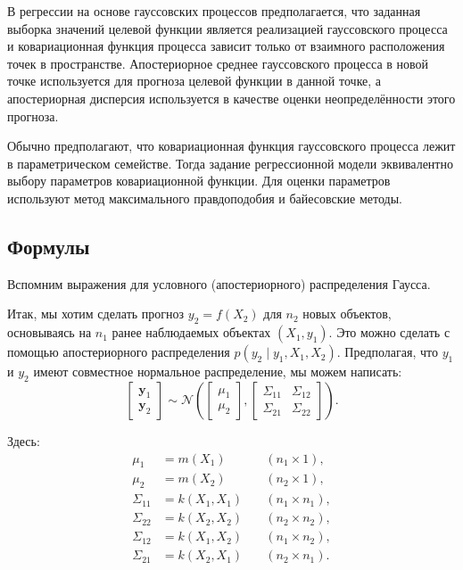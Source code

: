 \documentclass[11pt,a4paper]{article}
\begin{document}
    В регрессии на основе гауссовских процессов предполагается, что заданная
выборка значений целевой функции является реализацией гауссовского
процесса и ковариационная функция процесса зависит только от взаимного
расположения точек в пространстве. Апостериорное среднее гауссовского
процесса в новой точке используется для прогноза целевой функции в
данной точке, а апостериорная дисперсия используется в качестве оценки
неопределённости этого прогноза.

Обычно предполагают, что ковариационная функция гауссовского процесса
лежит в параметрическом семействе. Тогда задание регрессионной модели
эквивалентно выбору параметров ковариационной функции. Для оценки
параметров используют метод максимального правдоподобия и байесовские
методы.

    \hypertarget{ux444ux43eux440ux43cux443ux43bux44b}{%
\subsection{Формулы}\label{ux444ux43eux440ux43cux443ux43bux44b}}

Вспомним выражения для условного (апостериорного) распределения Гаусса.

Итак, мы хотим сделать прогноз \(y_2 = f(X_2)\) для \(n_2\) новых
объектов, основываясь на \(n_1\) ранее наблюдаемых объектах
\((X_1,y_1)\). Это можно сделать с помощью апостериорного распределения
\(p(y_2 \mid y_1, X_1, X_2)\). Предполагая, что \(y_1\) и \(y_2\) имеют
совместное нормальное распределение, мы можем написать:
\[
\left[\begin{array}{c} \mathbf{y}_{1} \\ \mathbf{y}_{2} \end{array}\right]
\sim
\mathcal{N} \left(
\left[\begin{array}{c} \mu_{1} \\ \mu_{2} \end{array}\right],
\left[ \begin{array}{cc}
\Sigma_{11} & \Sigma_{12} \\
\Sigma_{21} & \Sigma_{22}
\end{array} \right]
\right).
\]

Здесь: \[
\begin{aligned}
    \mu_{1}     &= m(X_1)     \quad & (n_1 \times 1),   \\
    \mu_{2}     &= m(X_2)     \quad & (n_2 \times 1),   \\
    \Sigma_{11} &= k(X_1,X_1) \quad & (n_1 \times n_1), \\
    \Sigma_{22} &= k(X_2,X_2) \quad & (n_2 \times n_2), \\
    \Sigma_{12} &= k(X_1,X_2) \quad & (n_1 \times n_2), \\
    \Sigma_{21} &= k(X_2,X_1) \quad & (n_2 \times n_1).
\end{aligned}
\]
\end{document}
